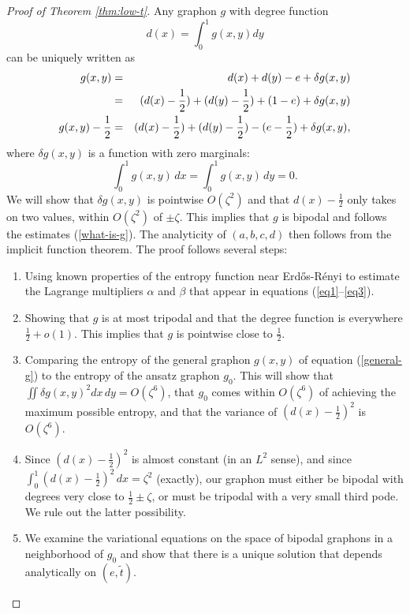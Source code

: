 \documentclass[10pt,a4paper]{amsart}
\begin{document}
\begin{proof}[Proof of Theorem \ref{thm:low-t}]

Any graphon $g$ with degree function 
\begin{equation}
d(x) = \int_0^1 g(x,y) dy
\end{equation}
can be uniquely written as 
\begin{eqnarray}\label{general-g}
g(x,y) & = & d(x) + d(y) - e + \delta g(x,y) \cr 
& = & (d(x)-\frac12) + (d(y)-\frac12) + (1-e) + \delta g(x,y) \cr 
g(x,y)-\frac12 & = & (d(x)-\frac12) + (d(y)-\frac12) - (e - \frac12) + \delta g(x,y), 
\end{eqnarray}
where $\delta g(x,y)$ is a function with zero marginals: 
\begin{equation}
\int_0^1 g(x,y) \, dx = \int_0^1 g(x,y) \, dy = 0. 
\end{equation}
We will show that $\delta g(x,y)$ is pointwise $O(\zeta^2)$ and that $d(x) - \frac12$ only 
takes on two values, within $O(\zeta^2)$
of $\pm \zeta$. This implies that $g$ is bipodal and follows the estimates 
(\ref{what-is-g}). The analyticity of $(a,b,c,d)$ then follows from the implicit function
theorem. The proof follows 
several steps: 
\begin{enumerate}
\item Using known properties of the entropy function near Erd\H{o}s-R\'enyi to estimate the 
Lagrange multipliers $\alpha$ and $\beta$ that appear in equations (\ref{eq1}--\ref{eq3}).
\item Showing that $g$ is at most tripodal and that the degree function is everywhere 
$\frac12 + o(1)$. This implies that $g$ is pointwise close to $\frac12$.
\item Comparing the entropy of the general graphon $g(x,y)$ of equation (\ref{general-g})
to the entropy of the ansatz graphon $g_0$. This will show that $\iint \delta g(x,y)^2
dx \, dy = O(\zeta^6)$, that $g_0$ comes within $O(\zeta^6)$ of achieving the 
maximum possible entropy, and that the variance of $(d(x)-\frac12)^2$ is $O(\zeta^6)$. 
\item Since $(d(x)-\frac12)^2$ is almost constant (in an $L^2$ sense), and since 
$\int_0^1 (d(x)-\frac12)^2 \, dx = \zeta^2$ (exactly), our graphon must either be 
bipodal with degrees very close to $\frac12 \pm \zeta$, or must be tripodal with a 
very small third pode. We rule out the latter possibility. 
\item We examine the variational equations on the space of bipodal graphons in a 
neighborhood of $g_0$ and show that there is a unique solution that depends analytically
on $(e,\tilde t)$. 
\end{enumerate}


\end{proof}
\end{document}
